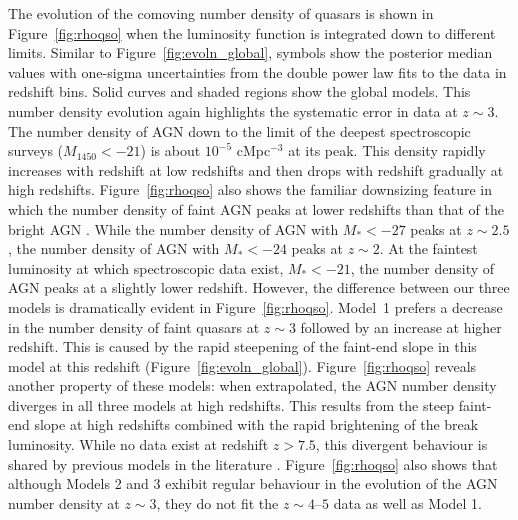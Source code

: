 \documentclass[fleqn,usenatbib]{mnras}
\begin{document}
The evolution of the comoving number density of quasars is shown in
Figure~\ref{fig:rhoqso} when the luminosity function is integrated
down to different limits.  Similar to Figure~\ref{fig:evoln_global},
symbols show the posterior median values with one-sigma uncertainties
from the double power law fits to the data in redshift bins.  Solid
curves and shaded regions show the global models.  This number density
evolution again highlights the systematic error in data at $z\sim 3$.
The number density of AGN down to the limit of the deepest
spectroscopic surveys ($M_{1450}<-21$) is about $10^{-5}$ cMpc$^{-3}$
at its peak.  This density rapidly increases with redshift at low
redshifts and then drops with redshift gradually at high redshifts.
Figure~\ref{fig:rhoqso} also shows the familiar downsizing feature in
which the number density of faint AGN peaks at lower redshifts than
that of the bright AGN \citep{2004ApJ...605..625H,
  2005MNRAS.360L..39N, 2006AJ....131.2766R, 2006A&A...451..443M,
  2009A&A...493...55E, 2013A&A...558A..89K, 2010MNRAS.401.2531A,
  2015MNRAS.451.1892A}.  While the number density of AGN with
$M_*<-27$ peaks at $z\sim 2.5$, the number density of AGN with
$M_*<-24$ peaks at $z\sim 2$.  At the faintest luminosity at which
spectroscopic data exist, $M_*<-21$, the number density of AGN peaks
at a slightly lower redshift.  However, the difference between our
three models is dramatically evident in Figure~\ref{fig:rhoqso}.
Model~1 prefers a decrease in the number density of faint quasars at
$z\sim 3$ followed by an increase at higher redshift.  This is caused
by the rapid steepening of the faint-end slope in this model at this
redshift (Figure~\ref{fig:evoln_global}).  Figure~\ref{fig:rhoqso}
reveals another property of these models: when extrapolated, the AGN
number density diverges in all three models at high redshifts.  This
results from the steep faint-end slope at high redshifts combined with
the rapid brightening of the break luminosity.  While no data exist at
redshift $z>7.5$, this divergent behaviour is shared by previous
models in the literature \citep{2007ApJ...654..731H}.
Figure~\ref{fig:rhoqso} also shows that although Models 2 and 3
exhibit regular behaviour in the evolution of the AGN number density
at $z\sim 3$, they do not fit the $z\sim 4$--$5$ data as well as Model
1.
\end{document}
